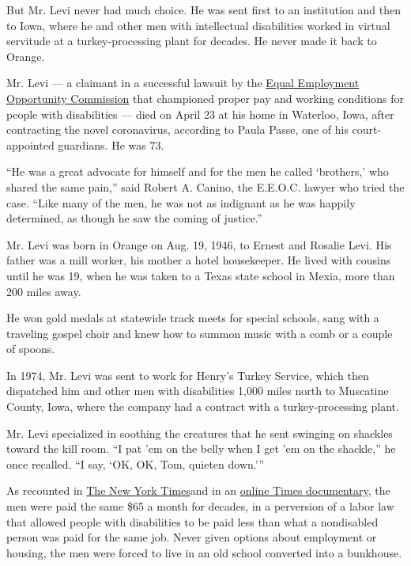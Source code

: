 But Mr. Levi never had much choice. He was sent first to an institution
and then to Iowa, where he and other men with intellectual disabilities
worked in virtual servitude at a turkey-processing plant for decades. He
never made it back to Orange.

Mr. Levi --- a claimant in a successful lawsuit by the
\href{https://www.eeoc.gov/}{Equal Employment Opportunity Commission}
that championed proper pay and working conditions for people with
disabilities --- died on April 23 at his home in Waterloo, Iowa, after
contracting the novel coronavirus, according to Paula Passe, one of his
court-appointed guardians. He was 73.

``He was a great advocate for himself and for the men he called
`brothers,' who shared the same pain,'' said Robert A. Canino, the
E.E.O.C. lawyer who tried the case. ``Like many of the men, he was not
as indignant as he was happily determined, as though he saw the coming
of justice.''

Mr. Levi was born in Orange on Aug. 19, 1946, to Ernest and Rosalie
Levi. His father was a mill worker, his mother a hotel housekeeper. He
lived with cousins until he was 19, when he was taken to a Texas state
school in Mexia, more than 200 miles away.

He won gold medals at statewide track meets for special schools, sang
with a traveling gospel choir and knew how to summon music with a comb
or a couple of spoons.

In 1974, Mr. Levi was sent to work for Henry's Turkey Service, which
then dispatched him and other men with disabilities 1,000 miles north to
Muscatine County, Iowa, where the company had a contract with a
turkey-processing plant.

Mr. Levi specialized in soothing the creatures that he sent swinging on
shackles toward the kill room. ``I pat 'em on the belly when I get 'em
on the shackle,'' he once recalled. ``I say, `OK, OK, Tom, quieten
down.'''

As recounted in
\href{https://www.nytimes.com/2014/07/31/us/from-schoolhouse-to-symbol-of-servitude-to-dust.html}{The
New York Times}and in an
\href{https://www.nytimes.com/2014/03/09/us/the-men-of-atalissa.html}{online
Times documentary}, the men were paid the same \$65 a month for decades,
in a perversion of a labor law that allowed people with disabilities to
be paid less than what a nondisabled person was paid for the same job.
Never given options about employment or housing, the men were forced to
live in an old school converted into a bunkhouse.


